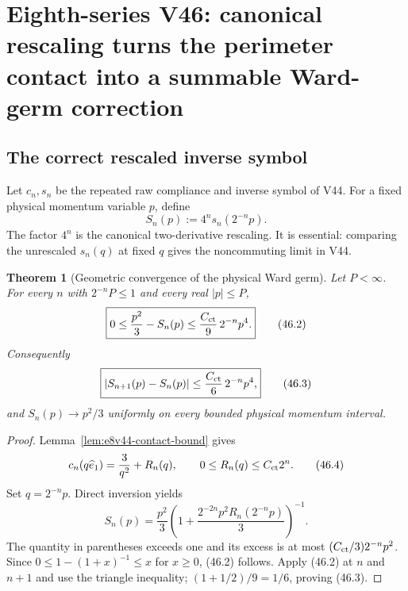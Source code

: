 \documentclass[11pt,oneside]{book}
\newtheorem{theorem}{Theorem}[chapter]
\theoremstyle{definition}
\theoremstyle{remark}
\begin{document}


\section{Eighth-series V46: canonical rescaling turns the perimeter
contact into a summable Ward-germ correction}
\label{sec:e8v46}

\subsection{The correct rescaled inverse symbol}

Let \(c_n,s_n\) be the repeated raw compliance and inverse symbol of
V44.  For a fixed physical momentum variable \(p\), define
\[
 S_n(p):=4^n s_n(2^{-n}p).                                     \tag{46.1}
\]
The factor \(4^n\) is the canonical two-derivative rescaling.  It is
essential: comparing the unrescaled \(s_n(q)\) at fixed \(q\) gives
the noncommuting limit in V44.

\begin{theorem}[Geometric convergence of the physical Ward germ]
\label{thm:e8v46-germ-convergence}
Let \(P<\infty\).  For every \(n\) with \(2^{-n}P\le1\) and every
real \(|p|\le P\),
\[
 \boxed{
 0\le\frac{p^2}{3}-S_n(p)
 \le\frac{C_{\rm ct}}9\,2^{-n}p^4.}                            \tag{46.2}
\]
Consequently
\[
 \boxed{
 |S_{n+1}(p)-S_n(p)|
 \le\frac{C_{\rm ct}}6\,2^{-n}p^4,}                            \tag{46.3}
\]
and \(S_n(p)\to p^2/3\) uniformly on every bounded physical
momentum interval.
\end{theorem}

\begin{proof}
Lemma~\ref{lem:e8v44-contact-bound} gives
\[
 c_n(q\widehat e_1)=\frac3{q^2}+R_n(q),\qquad
 0\le R_n(q)\le C_{\rm ct}2^n.                                \tag{46.4}
\]
Set \(q=2^{-n}p\).  Direct inversion yields
\[
 S_n(p)
 =\frac{p^2}{3}
 \left(1+\frac{2^{-2n}p^2R_n(2^{-n}p)}3\right)^{-1}.            \tag{46.5}
\]
The quantity in parentheses exceeds one and its excess is at most
\((C_{\rm ct}/3)2^{-n}p^2\).  Since
\(0\le1-(1+x)^{-1}\le x\) for \(x\ge0\), (46.2) follows.
Apply (46.2) at \(n\) and \(n+1\) and use the triangle inequality;
\((1+1/2)/9=1/6\), proving (46.3).
\end{proof}
\end{document}

